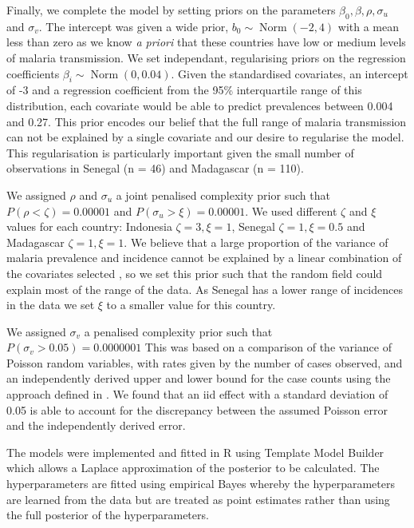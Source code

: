 \documentclass{statsoc}
\begin{document}
Finally, we complete the model by setting priors on the parameters $\beta_0, \beta, \rho, \sigma_u$ and $\sigma_v$.
The intercept was given a wide prior, $b_0 \sim \operatorname{Norm}(-2, 4)$ with a mean less than zero as we know \emph{a priori} that these countries have low or medium levels of malaria transmission.
We set independant, regularising priors on the regression coefficients $\beta_i \sim \operatorname{Norm}(0, 0.04)$. 
Given the standardised covariates, an intercept of -3 and a regression coefficient from the 95\% interquartile range of this distribution, each covariate would be able to predict prevalences between 0.004 and 0.27. 
This prior encodes our belief that the full range of malaria transmission can not be explained by a single covariate and our desire to regularise the model.
This regularisation is particularly important given the small number of observations in Senegal (n = 46) and Madagascar (n = 110).

We assigned $\rho$ and $\sigma_u$ a joint penalised complexity prior \citep{fuglstad2018constructing} such that $P(\rho < \zeta) = 0.00001$ and $P(\sigma_u > \xi) = 0.00001$.
We used different $\zeta$  and $\xi$ values for each country: Indonesia $\zeta = 3, \xi = 1$, Senegal $\zeta = 1, \xi = 0.5$ and Madagascar $\zeta = 1, \xi = 1$.
We believe that a large proportion of the variance of malaria prevalence and incidence cannot be explained by a linear combination of the covariates selected \citep{bhatt2017improved}, so we set this prior such that the random field could explain most of the range of the data.
As Senegal has a lower range of incidences in the data we set $\xi$ to a smaller value for this country.

We assigned $\sigma_v$ a penalised complexity prior \citep{simpson2017penalising} such that $P(\sigma_v > 0.05) = 0.0000001$
This was based on a comparison of the variance of Poisson random variables, with rates given by the number of cases observed, and an independently derived upper and lower bound for the case counts using the approach defined in \citep{cibulskis2011worldwide}.
We found that an iid effect with a standard deviation of 0.05 is able to account for the discrepancy between the assumed Poisson error and the independently derived error.


The models were implemented and fitted in R \citep{R} using Template Model Builder \citep{TMB} which allows a Laplace approximation of the posterior to be calculated.
The hyperparameters are fitted using empirical Bayes whereby the hyperparameters are learned from the data but are treated as point estimates rather than using the full posterior of the hyperparameters.
\end{document}
